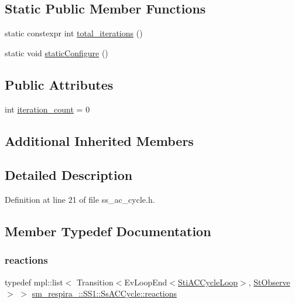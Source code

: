 \subsection*{Static Public Member Functions}
\begin{DoxyCompactItemize}
\item 
static constexpr int \hyperlink{structsm__respira__1_1_1SS1_1_1SsACCycle_aa69a614394dc619067fc5cce34471d48}{total\+\_\+iterations} ()
\item 
static void \hyperlink{structsm__respira__1_1_1SS1_1_1SsACCycle_ab09e6e93419ceed8518f91810c14ef9e}{static\+Configure} ()
\end{DoxyCompactItemize}
\subsection*{Public Attributes}
\begin{DoxyCompactItemize}
\item 
int \hyperlink{structsm__respira__1_1_1SS1_1_1SsACCycle_a362b69f0bdd17523201cb0592b873775}{iteration\+\_\+count} = 0
\end{DoxyCompactItemize}
\subsection*{Additional Inherited Members}


\subsection{Detailed Description}


Definition at line 21 of file ss\+\_\+ac\+\_\+cycle.\+h.



\subsection{Member Typedef Documentation}
\mbox{\label{structsm__respira__1_1_1SS1_1_1SsACCycle_aaf8a711a309ca6d5f385b66010b74ff0}} 
\subsubsection{\texorpdfstring{reactions}{reactions}}
{\footnotesize\ttfamily typedef mpl\+::list$<$ Transition$<$Ev\+Loop\+End$<$\hyperlink{structsm__respira__1_1_1ac__cycle__inner__states_1_1StiACCycleLoop}{Sti\+A\+C\+Cycle\+Loop}$>$, \hyperlink{structsm__respira__1_1_1StObserve}{St\+Observe}$>$ $>$ \hyperlink{structsm__respira__1_1_1SS1_1_1SsACCycle_aaf8a711a309ca6d5f385b66010b74ff0}{sm\+\_\+respira\+\_\+::\+S\+S1\+::\+Ss\+A\+C\+Cycle\+::reactions}}



